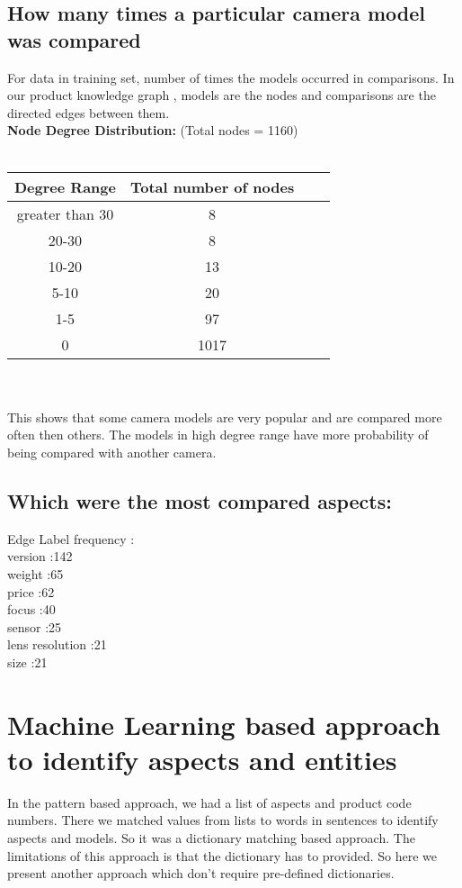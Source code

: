\documentclass[12pt]{article}
\begin{document}
\subsection{How many times a particular camera model was compared}
For data in training set, number of times the models occurred in comparisons. In our product knowledge graph , models are the nodes and comparisons are the directed edges between them. \\
\textbf{Node Degree Distribution:} (Total nodes = 1160) \\\\
\begin{tabular}{ | c || c | c | r |  }
\hline			
  Degree Range & Total number of nodes \\ \hline
  greater than 30 & 8 \\ \hline
  20-30 & 8\\ \hline
  10-20 & 13 \\ \hline
  5-10 & 20 \\ \hline
   1-5 & 97 \\ \hline
    0 & 1017 \\ \hline
\end{tabular} \\
\noindent  \\
This shows that some camera models are very popular and are compared more often then others.
The models in high degree range have more probability of being compared with another camera.

\subsection{Which were the most compared aspects:}
Edge Label frequency : \\
version   :142 \\
weight    :65 \\
price     :62\\
focus     :40\\
sensor    :25\\
lens resolution :21\\
size      :21

\section{Machine Learning based approach to identify aspects and entities}
In the pattern based approach, we had a list of aspects and product code numbers. There we matched values from lists to words in sentences to identify aspects and models. So it was a dictionary matching based approach. The limitations of this approach is that the dictionary has to provided. So here we present another approach which don't require pre-defined dictionaries.
\end{document}
